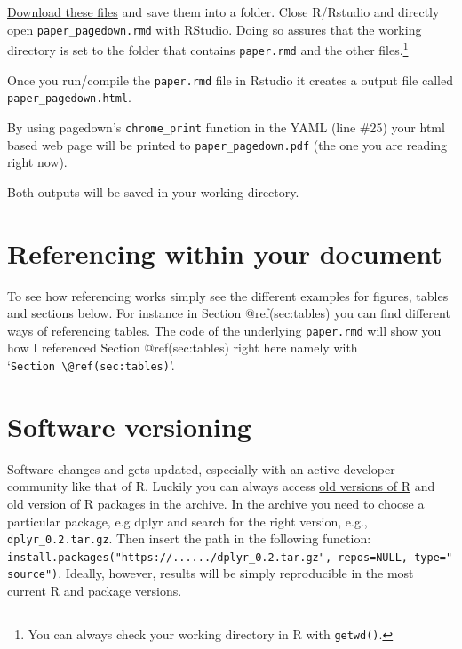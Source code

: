 \documentclass[
  letterpaper,
  DIV=11,
  numbers=noendperiod]{scrartcl}
\begin{document}
\href{https://drive.google.com/drive/folders/1rWzj-Bu1EKqkSuE1gaFzduBJhzlThpkw?usp=sharing}{Download
these files} and save them into a folder. Close R/Rstudio and directly
open \texttt{paper\_pagedown.rmd} with RStudio. Doing so assures that
the working directory is set to the folder that contains
\texttt{paper.rmd} and the other files.\footnote{You can always check
  your working directory in R with \texttt{getwd()}.}

Once you run/compile the \texttt{paper.rmd} file in Rstudio it creates a
output file called \texttt{paper\_pagedown.html}.

By using pagedown's \texttt{chrome\_print} function in the YAML (line
\#25) your html based web page will be printed to
\texttt{paper\_pagedown.pdf} (the one you are reading right now).

Both outputs will be saved in your working directory.

\hypertarget{referencing-within-your-document}{%
\section{Referencing within your
document}\label{referencing-within-your-document}}

To see how referencing works simply see the different examples for
figures, tables and sections below. For instance in Section
@ref(sec:tables) you can find different ways of referencing tables. The
code of the underlying \texttt{paper.rmd} will show you how I referenced
Section @ref(sec:tables) right here namely with
`\texttt{Section\ \textbackslash{}@ref(sec:tables)}'.

\hypertarget{software-versioning}{%
\section{Software versioning}\label{software-versioning}}

Software changes and gets updated, especially with an active developer
community like that of R. Luckily you can always access
\href{https://cran.r-project.org/bin/windows/base/old/}{old versions of
R} and old version of R packages in
\href{https://cran.r-project.org/src/contrib/Archive/}{the archive}. In
the archive you need to choose a particular package, e.g dplyr and
search for the right version, e.g., \texttt{dplyr\_0.2.tar.gz}. Then
insert the path in the following function:
\texttt{install.packages("https://....../dplyr\_0.2.tar.gz",\ repos=NULL,\ type="source")}.
Ideally, however, results will be simply reproducible in the most
current R and package versions.
\end{document}
